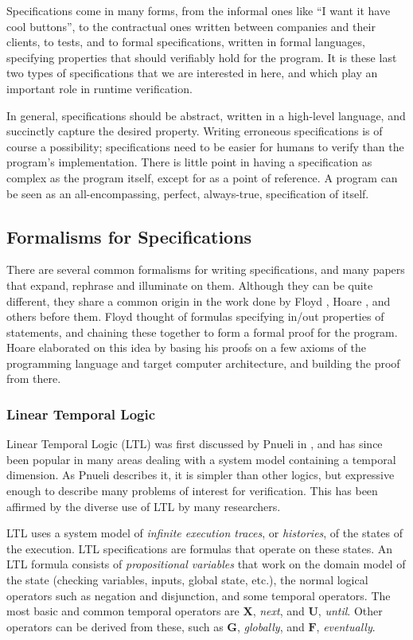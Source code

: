\documentclass[a4paper,11pt]{kth-mag}
\begin{document}
Specifications come in many forms, from the informal ones like ``I want it have
cool buttons'', to the contractual ones written between companies and their
clients, to tests, and to formal specifications, written in formal languages,
specifying properties that should verifiably hold for the program. It is these
last two types of specifications that we are interested in here, and which play
an important role in runtime verification.

In general, specifications should be abstract, written in a high-level
language, and succinctly capture the desired property. Writing erroneous
specifications is of course a possibility; specifications need to be easier for
humans to verify than the program's implementation. There is little point in
having a specification as complex as the program itself, except for as a point
of reference. A program can be seen as an all-encompassing, perfect,
always-true, specification of itself.


\subsection{Formalisms for Specifications}

There are several common formalisms for writing specifications, and many papers
that expand, rephrase and illuminate on them. Although they can be quite
different, they share a common origin in the work done by Floyd \cite{floyd67},
Hoare \cite{hoare69}, and others before them.  Floyd thought of formulas
specifying in/out properties of statements, and chaining these together to form
a formal proof for the program. Hoare elaborated on this idea by basing his
proofs on a few axioms of the programming language and target computer
architecture, and building the proof from there.


\subsubsection{Linear Temporal Logic}

Linear Temporal Logic (LTL) was first discussed by Pnueli in \cite{pnueli77},
and has since been popular in many areas dealing with a system model containing
a temporal dimension. As Pnueli describes it, it is simpler than other logics,
but expressive enough to describe many problems of interest for verification.
This has been affirmed by the diverse use of LTL by many researchers.

LTL uses a system model of \textit{infinite execution traces}, or
\textit{histories}, of the states of the execution. LTL specifications are
formulas that operate on these states. An LTL formula consists of
\textit{propositional variables} that work on the domain model of the state
(checking variables, inputs, global state, etc.), the normal logical operators
such as negation and disjunction, and some temporal operators. The most basic
and common temporal operators are $\boldsymbol{X}$, \textit{next}, and
$\boldsymbol{U}$, \textit{until}. Other operators can be derived from these,
such as $\boldsymbol{G}$, \textit{globally}, and $\boldsymbol{F}$,
\textit{eventually}.
\end{document}
